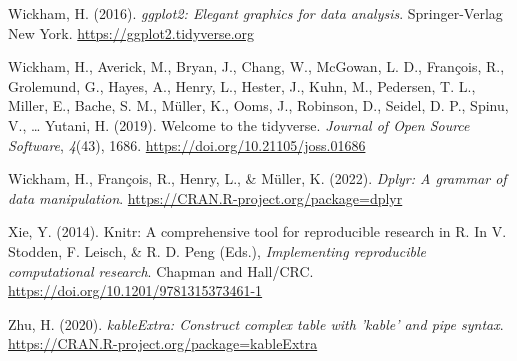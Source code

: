 \documentclass[
  bookmarksnumbered]{article}
\newlength{\cslhangindent}
\newlength{\cslentryspacingunit} %
\newenvironment{CSLReferences}[2] %
 {%
  \setlength{\parindent}{0pt}
  \ifodd #1
  \let\oldpar\par
  \def\par{\hangindent=\cslhangindent\oldpar}
  \fi
  \setlength{\parskip}{#2\cslentryspacingunit}
 }%
 {}
\begin{document}
\begin{CSLReferences}{1}{0}
\leavevmode{}%
Wickham, H. (2016). \emph{ggplot2: Elegant graphics for data analysis}. Springer-Verlag New York. \url{https://ggplot2.tidyverse.org}

\leavevmode{}%
Wickham, H., Averick, M., Bryan, J., Chang, W., McGowan, L. D., François, R., Grolemund, G., Hayes, A., Henry, L., Hester, J., Kuhn, M., Pedersen, T. L., Miller, E., Bache, S. M., Müller, K., Ooms, J., Robinson, D., Seidel, D. P., Spinu, V., \ldots{} Yutani, H. (2019). Welcome to the {tidyverse}. \emph{Journal of Open Source Software}, \emph{4}(43), 1686. \url{https://doi.org/10.21105/joss.01686}

\leavevmode{}%
Wickham, H., François, R., Henry, L., \& Müller, K. (2022). \emph{Dplyr: A grammar of data manipulation}. \url{https://CRAN.R-project.org/package=dplyr}

\leavevmode{}%
Xie, Y. (2014). Knitr: A comprehensive tool for reproducible research in {R}. In V. Stodden, F. Leisch, \& R. D. Peng (Eds.), \emph{Implementing reproducible computational research}. {Chapman and Hall/CRC}. \url{https://doi.org/10.1201/9781315373461-1}

\leavevmode{}%
Zhu, H. (2020). \emph{kableExtra: Construct complex table with 'kable' and pipe syntax}. \url{https://CRAN.R-project.org/package=kableExtra}

\end{CSLReferences}
\end{document}
